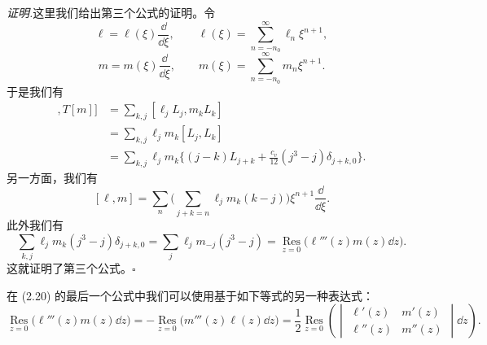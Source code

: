 \noindent\textit{证明.}\quad 这里我们给出第三个公式的证明。令
\[
\ell=\ell(\xi)\frac{\dd}{\dd\xi},\qquad
\ell(\xi)=\sum_{n=-n_0}^{\infty}\ell_n\xi^{n+1},
\]
\[
m=m(\xi)\frac{\dd}{\dd\xi},\qquad
m(\xi)=\sum_{n=-n_0}^{\infty}m_n\xi^{n+1}.
\]
于是我们有
\begin{align*}
[T[\ell],T[m]]&=\sum_{k,j}[\ell_jL_j,m_kL_k]\\
&=\sum_{k,j}\ell_jm_k[L_j,L_k]\\
&=\sum_{k,j}\ell_jm_k\Big\{(j-k)L_{j+k}+\frac{c_v}{12}(j^{3}-j)\delta_{j+k,0}\Big\}.
\end{align*}
另一方面，我们有
\[
[\ell,m]=\sum_{n}\Big(\sum_{j+k=n}\ell_jm_k(k-j)\Big)\xi^{n+1}\frac{\dd}{\dd\xi}.
\]
此外我们有
\[
\sum_{k,j}\ell_jm_k(j^{3}-j)\delta_{j+k,0}
=\sum_{j}\ell_jm_{-j}(j^{3}-j)
=\operatorname*{Res}_{z=0}\big(\ell'''(z)m(z)\dd z\big).
\]
这就证明了第三个公式。\hfill$\square$


\begin{remark}[2.14]
在 (2.20) 的最后一个公式中我们可以使用基于如下等式的另一种表达式：
\[
\operatorname*{Res}_{z=0}\big(\ell'''(z)m(z)\dd z\big)
=-\operatorname*{Res}_{z=0}\big(m'''(z)\ell(z)\dd z\big)
=\frac{1}{2}\operatorname*{Res}_{z=0}\left(\begin{vmatrix}
\ell'(z)&m'(z)\\
\ell''(z)&m''(z)
\end{vmatrix}\dd z\right).
\]
\end{remark}

